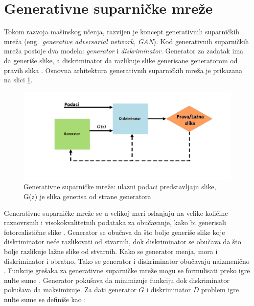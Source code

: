 \documentclass[12pt,oneside]{memoir}
\begin{document}
\section{Generativne suparničke mreže}
\label{section3_increasedata_gan}

Tokom razvoja mašinskog učenja, razvijen je koncept generativnih suparničkih mreža (eng.~\textit{generative adversarial network, GAN}). Kod generativnih suparničkih mreža postoje dva modela: \textit{generator} i \textit{diskriminator}. Generator za zadatak ima da generiše slike, a diskriminator da razlikuje slike generisane generatorom od pravih slika \cite{goodfellow2014generative}.
Osnovna arhitektura generativnih suparničkih mreža je prikazana na slici \ref{fig:section2_gans}.

\begin{figure}[ht]
    \centering
    \includegraphics[width=1\textwidth]{matfmaster/glava2/gans_cus.png}
    \caption{Generativne suparničke mreže: ulazni podaci predstavljaju slike, G(z) je  slika generisa od strane generatora \cite{gans_image}}
    \label{fig:section2_gans}
\end{figure}

Generativne suparničke mreže se u velikoj meri oslanjaju na velike količine raznovrsnih i visokokvalitetnih podataka za obučavanje, kako bi generisali fotorealistične slike \cite{zhao2020differentiable}. 
Generator se obučava da što bolje generiše slike koje diskriminator neće razlikovati od stvarnih, dok diskriminator se obučava da što bolje razlikuje lažne slike od stvarnih. Kako se generator menja, mora i diskriminator i obratno. Tako se generator i diskriminator obučavaju naizmenično \cite{ml2019}. 
Funkcije grešaka za generativne suparničke mreže mogu se formulisati preko igre nulte sume \cite{goodfellow2020generative, hodgson2006microeconomics}. Generator pokušava da minimizuje funkciju dok diskriminator pokušava da maksimizuje. Za dati generator $G$ i diskriminator $D$ problem igre nulte sume se definiše kao \cite{goodfellow2020generative, ml2019}:
\end{document}

